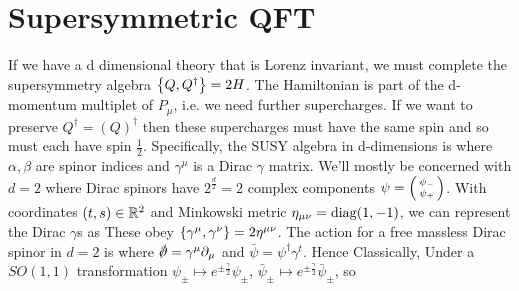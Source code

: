 \documentclass{article}
\begin{document}
\section{Supersymmetric QFT}
If we have a d dimensional theory that is Lorenz invariant, we must complete the supersymmetry algebra $\acomm[Q]{Q^\dagger} = 2H$. The Hamiltonian is part of the d-momentum multiplet of $P_\mu$, i.e. we need further supercharges. If we want to preserve $Q^\dagger = (Q)^\dagger$ then these supercharges must have the same spin and so must each have spin $\frac{1}{2}$. Specifically, the SUSY algebra in d-dimensions is 
where $\alpha,\beta$ are spinor indices and $\gamma^\mu$ is a Dirac $\gamma$ matrix. We'll mostly be concerned with $d=2$ where Dirac spinors have $2^\frac{d}{2} = 2$ complex components $\psi = \begin{psmallmatrix} \psi_- \\ \psi_+ \end{psmallmatrix}$. With coordinates $(t,s) \in \mbb{R}^2$ and Minkowski metric $\eta_{\mu\nu} = \diag(1,-1)$, we can represent the Dirac $\gamma$s as 
These obey $\acomm[\gamma^\mu]{\gamma^\nu} = 2\eta^{\mu\nu}$. The action for a free massless Dirac spinor in $d=2$ is 
where $\slashed{\del} = \gamma^\mu \del_\mu$ and $\bar{\psi} = \psi^\dagger \gamma^t$. Hence 
Classically, 
Under a $SO(1,1)$ transformation $\psi_\pm \mapsto e^{\pm \frac{\gamma}{2}}\psi_\pm$, $\bar{\psi}_\pm \mapsto e^{\pm \frac{\gamma}{2}}\bar{\psi}_\pm$, so 
\end{document}

